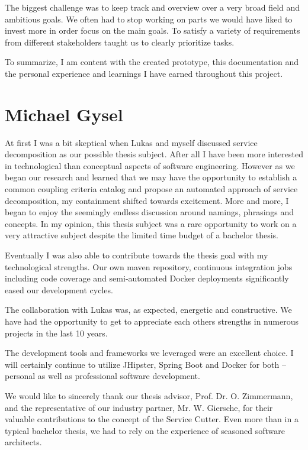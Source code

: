 The biggest challenge was to keep track and overview over a very broad field and ambitious goals. We often had to stop working on parts we would have liked to invest more in order focus on the main goals. To satisfy a variety of requirements from different stakeholders taught us to clearly prioritize tasks. 

To summarize, I am content with the created prototype, this documentation and the personal experience and learnings I have earned throughout this project. 


\section{Michael Gysel}

At first I was a bit skeptical when Lukas and myself discussed service decomposition as our possible thesis subject. After all I have been more interested in technological than conceptual aspects of software engineering. However as we began our research and learned that we may have the opportunity to establish a common coupling criteria catalog and propose an automated approach of service decomposition, my containment shifted towards excitement. More and more, I began to enjoy the seemingly endless discussion around namings, phrasings and concepts. In my opinion, this thesis subject was a rare opportunity to work on a very attractive subject despite the limited time budget of a bachelor thesis.

Eventually I was also able to contribute towards the thesis goal with my technological strengths. Our own maven repository, continuous integration jobs including code coverage and semi-automated Docker deployments significantly eased our development cycles.

The collaboration with Lukas was, as expected, energetic and constructive. We have had the opportunity to get to appreciate each others strengths in numerous projects in the last 10 years.

The development tools and frameworks we leveraged were an excellent choice. I will certainly continue to utilize JHipster, Spring Boot and Docker for both -- personal as well as professional software development.

\bigskip

We would like to sincerely thank our thesis advisor, Prof. Dr. O. Zimmermann, and the representative of our industry partner, Mr. W. Giersche, for their valuable contributions to the concept of the Service Cutter. Even more than in a typical bachelor thesis, we had to rely on the experience of seasoned software architects.